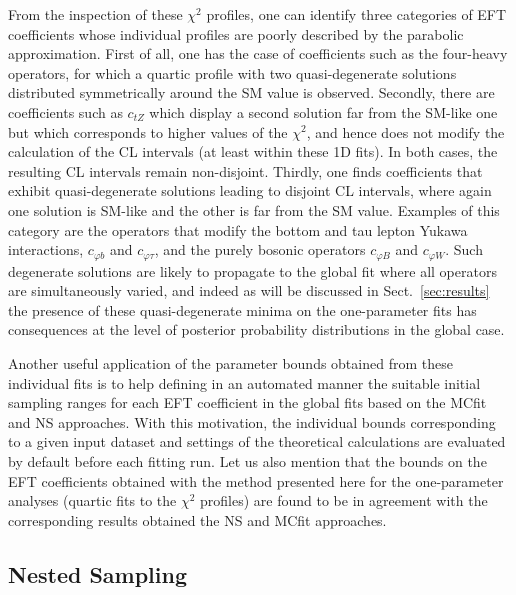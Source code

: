 From the inspection of these $\chi^2$ profiles,
one can identify three categories of EFT coefficients whose individual profiles
are poorly described by the parabolic approximation.
%
First of all, one has the case of coefficients such as the four-heavy operators, for which a quartic profile
with two quasi-degenerate solutions distributed symmetrically around the SM value is observed.
%
Secondly, there are coefficients such as $c_{tZ}$ which display a second solution
far from the SM-like one but which corresponds to higher values of the $\chi^2$, and hence
does not modify the calculation of the CL intervals (at least within these 1D fits).
%
In both cases,  the resulting CL intervals remain non-disjoint.
%
Thirdly, one finds coefficients that exhibit quasi-degenerate solutions leading to
disjoint CL intervals, where again one solution is SM-like and the other is far from the SM value.
%
Examples of this category are the operators that modify the bottom 
 and tau lepton Yukawa interactions, $c_{\varphi b}$ and $c_{\varphi \tau}$, and
 the purely bosonic operators $c_{\varphi B}$ and $c_{\varphi W}$.
 Such degenerate solutions are likely to propagate to the global fit where all operators
 are simultaneously varied,
 and indeed as will be discussed in Sect.~\ref{sec:results} the presence of these quasi-degenerate
 minima on the one-parameter fits has consequences at the level
 of posterior probability distributions in the global case.
 
Another useful application of the parameter bounds
obtained from these individual fits is to help defining in an automated manner
the suitable initial 
sampling ranges for each EFT coefficient  in the global fits based on the MCfit and NS approaches.
%
With this motivation, the individual bounds
corresponding to a given input dataset and settings of the theoretical calculations
are evaluated by default before each fitting run.
%
Let us also mention that the bounds on the EFT coefficients obtained
with the method presented here for the one-parameter analyses (quartic fits to the $\chi^2$ profiles) are found
to be in agreement with the corresponding results obtained the NS and MCfit approaches.


\subsection{Nested Sampling}
\label{sec:nestedsampling}

